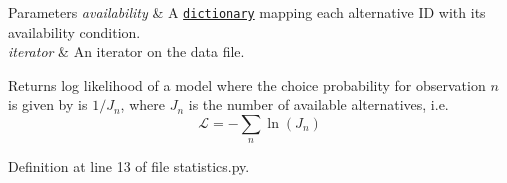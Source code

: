 \begin{DoxyParams}{Parameters}
{\em availability} & A \href{http://docs.python.org/py3k/tutorial/datastructures.html#dictionaries}{\tt dictionary} mapping each alternative ID with its availability condition. \\
\hline
{\em iterator} & An iterator on the data file. \\
\hline
\end{DoxyParams}
\begin{DoxyReturn}{Returns}
log likelihood of a model where the choice probability for observation $n$ is given by is $1/J_n$, where $J_n$ is the number of available alternatives, i.\+e. \[ \mathcal{L} = -\sum_n \ln(J_n) \] 
\end{DoxyReturn}


Definition at line 13 of file statistics.\+py.

